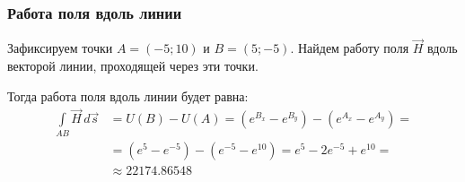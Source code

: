 \begin{frame}\frametitle{Работа поля вдоль линии}
  Зафиксируем точки \(A = (-5; 10)\) и \(B = (5; -5)\).
  Найдем работу поля $\vec H$ вдоль векторой линии, 
  проходящей через эти точки.
  
  Тогда работа поля вдоль линии будет равна:
  \begin{align*}
    \int\limits_{AB} \vec H \, d \vec s
    &=
    U(B) - U(A)
    =
    (e^{B_x} - e^{B_y}) - (e^{A_x} - e^{A_y}) = \\
    &= (e^5 - e^{-5}) - (e^{-5} - e^{10}) =
    e^5 - 2 e^{-5} + e^{10} = \\
    & \approx 22174.86548
    \label{eq:work_across_line}
  \end{align*}
\end{frame}
